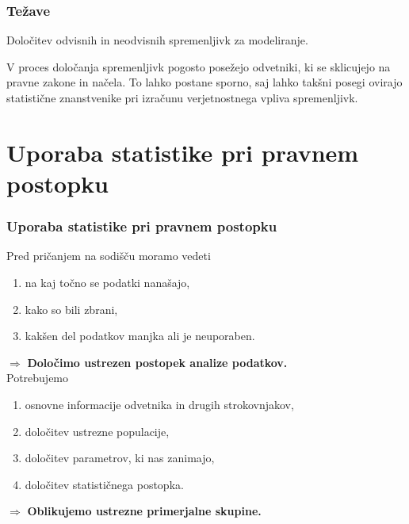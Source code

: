 \documentclass{beamer}
\begin{document}
\begin{frame}
    \frametitle{Težave}
    \begin{block}{}
        \centering
        Določitev odvisnih in neodvisnih spremenljivk za modeliranje.
    \end{block}
    V proces določanja spremenljivk pogosto posežejo odvetniki, ki se sklicujejo na pravne zakone in načela. To lahko postane sporno, saj lahko takšni 
    posegi ovirajo statistične znanstvenike pri izračunu verjetnostnega vpliva spremenljivk.
\end{frame}

\section{Uporaba statistike pri pravnem postopku}

\begin{frame}
    \frametitle{Uporaba statistike pri pravnem postopku}
    Pred pričanjem na sodišču moramo vedeti
    \begin{enumerate}
        \item na kaj točno se podatki nanašajo,
        \item kako so bili zbrani,
        \item kakšen del podatkov manjka ali je neuporaben.
    \end{enumerate}
    $\Rightarrow$ \textbf{Določimo ustrezen postopek analize podatkov.}\\ \vspace{3mm}
    Potrebujemo
    \begin{enumerate}
        \item osnovne informacije odvetnika in drugih strokovnjakov,
        \item določitev ustrezne populacije,
        \item določitev parametrov, ki nas zanimajo,
        \item določitev statističnega postopka.
    \end{enumerate}
    $\Rightarrow$ \textbf{Oblikujemo ustrezne primerjalne skupine.}
\end{frame}
\end{document}
